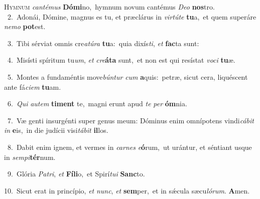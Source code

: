 \lettrine{\initial\textcolor{\initialcolor}{H}}{ymnum} \textit{can}\-\textit{té}\textit{mus} \textbf{Dó}\-\textbf{mi}no,~\star hymnum novum cantémus \textit{De}\-\textit{o} \textbf{nos}\-tro.\\
{\numbfont\textcolor{\numbcolor}{~2.}}~Adonái, Dómine, magnus es tu, et præclárus in \textit{vir}\-\textit{tú}\textit{te} \textbf{tu}\-a,~\star et quem superáre \textit{ne}\-\textit{mo} \textbf{pot}\-est.\par
{\numbfont\textcolor{\numbcolor}{~3.}}~Tibi sérviat omnis cre\-\textit{a}\-\textit{tú}\textit{ra} \textbf{tu}\-a:~\star quia dixís\-\textit{ti}\-, \textit{et} \textbf{fac}\-ta sunt:\par
{\numbfont\textcolor{\numbcolor}{~4.}}~Misísti spíritum tu\-\textit{um}\-, \textit{et} \textit{cre}\-\textbf{á}\textbf{ta} sunt,~\star et non est qui resístat \textit{vo}\-\textit{ci} \textbf{tu}\-æ.\par
{\numbfont\textcolor{\numbcolor}{~5.}}~Montes a fundaméntis move\-\textit{bún}\-\textit{tur} \textit{cum} \textbf{a}\-quis:~\star petræ, sicut cera, liquéscent ante fá\-\textit{ci}\-\textit{em} \textbf{tu}\-am.\par
{\numbfont\textcolor{\numbcolor}{~6.}}~\textit{Qui} \textit{au}\-\textit{tem} \textbf{ti}\-\textbf{ment} te,~\star magni erunt apud \textit{te} \textit{per} \textbf{óm}\-nia.\par
{\numbfont\textcolor{\numbcolor}{~7.}}~Væ genti insurgénti super genus meum: Dóminus enim omnípotens vindi\-\textit{cá}\-\textit{bit} \textit{in} \textbf{e}\-is,~\star in die judícii visi\-\textit{tá}\-\textit{bit} \textbf{il}\-los.\par
{\numbfont\textcolor{\numbcolor}{~8.}}~Dabit enim ignem, et vermes in \textit{car}\-\textit{nes} \textit{e}\-\textbf{ó}rum,~\star ut urántur, et séntiant usque in \textit{sem}\-\textit{pi}\textbf{tér}num.\par
{\numbfont\textcolor{\numbcolor}{~9.}}~Glória \textit{Pa}\-\textit{tri}, \textit{et} \textbf{Fí}\-\textbf{li}o,~\star et Spirí\-\textit{tu}\-\textit{i} \textbf{Sanc}\-to.\par
{\numbfont\textcolor{\numbcolor}{10.}}~Sicut erat in princípio, \textit{et} \textit{nunc}\-, \textit{et} \textbf{sem}\-per,~\star et in sǽcula sæcu\-\textit{ló}\-\textit{rum}. \textbf{A}\-men.\par
